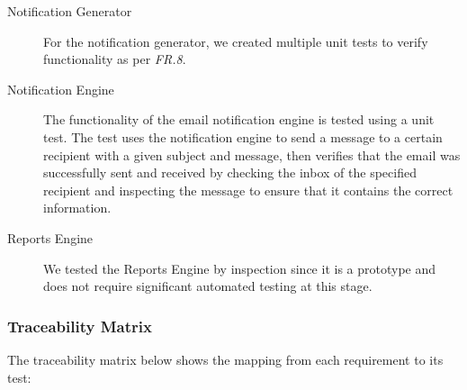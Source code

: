 \documentclass[10pt,a4paper]{article}
\newcommand{\frit}[1]{\textit{FR.#1}}
\begin{document}
\begin{description}
  \item[Notification Generator] For the notification generator, we created 
	multiple unit tests to verify functionality as per \frit{8}.
  
  \item[Notification Engine] The functionality of the email notification 
	engine is tested using a unit test. The test uses the notification engine 
	to send a message to a certain recipient with a given subject and message, 
	then verifies that the email was successfully sent and received by checking 
	the inbox of the specified recipient and inspecting the message to ensure 
	that it contains the correct information.

  \item[Reports Engine] We tested the Reports Engine by inspection since it 
	is a prototype and does not require significant automated testing at this 
	stage.

 \end{description}

\subsubsection{Traceability Matrix}

The traceability matrix below shows the mapping from each requirement to its test:
\end{document}
